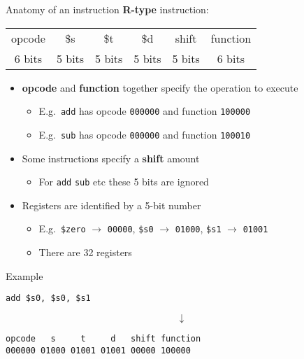 \begin{frame}[fragile]{Anatomy of an instruction}
	\pause \textbf{R-type} instruction:
	\setlength{\tabcolsep}{4.8pt}
		\begin{tabular}{|*{32}{c|}}
			\hline &&&&&&&&&&&&&&&&&&&&&&&&&&&&&&& \\\hline
			\multicolumn{6}{|c|}{opcode} &
			\multicolumn{5}{|c|}{\$s} &
			\multicolumn{5}{|c|}{\$t} &
			\multicolumn{5}{|c|}{\$d} &
			\multicolumn{5}{|c|}{shift} &
			\multicolumn{6}{|c|}{function} \\
			\multicolumn{6}{|c|}{6 bits} &
			\multicolumn{5}{|c|}{5 bits} &
			\multicolumn{5}{|c|}{5 bits} &
			\multicolumn{5}{|c|}{5 bits} &
			\multicolumn{5}{|c|}{5 bits} &
			\multicolumn{6}{|c|}{6 bits} \\\hline
		\end{tabular}
	\begin{itemize}
		\pause\item \textbf{opcode} and \textbf{function} together specify the operation to execute
			\begin{itemize}
				\pause\item E.g.\ \lstinline{add} has opcode \texttt{000000} and function \texttt{100000}
				\pause\item E.g.\ \lstinline{sub} has opcode \texttt{000000} and function \texttt{100010}
			\end{itemize}
		\pause\item Some instructions specify a \textbf{shift} amount
			\begin{itemize}
				\pause\item For \lstinline{add} \lstinline{sub} etc these 5 bits are ignored
			\end{itemize}
		\pause\item Registers are identified by a 5-bit number
			\begin{itemize}
				\pause\item E.g.\ \lstinline{$zero} $\to$ \texttt{00000}, \lstinline{$s0} $\to$ \texttt{01000}, \lstinline{$s1} $\to$ \texttt{01001}
				\pause\item There are 32 registers
			\end{itemize}
	\end{itemize}
\end{frame}

\begin{frame}[fragile]{Example}
	\begin{lstlisting}
add $s0, $s0, $s1
	\end{lstlisting}
	$$ \downarrow $$
	\begin{lstlisting}
opcode   s     t     d   shift function
000000 01000 01001 01001 00000 100000
	\end{lstlisting}
\end{frame}

